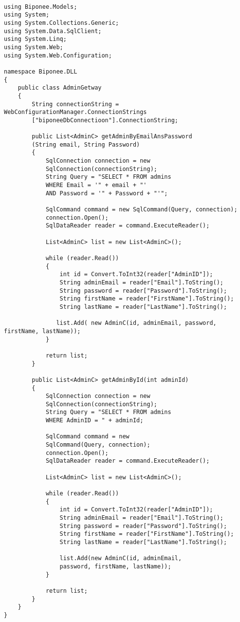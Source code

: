 \begin{lstlisting}

using Biponee.Models;
using System;
using System.Collections.Generic;
using System.Data.SqlClient;
using System.Linq;
using System.Web;
using System.Web.Configuration;

namespace Biponee.DLL
{
    public class AdminGetway
    {
        String connectionString = WebConfigurationManager.ConnectionStrings
        ["biponeeDbConnectioon"].ConnectionString;

        public List<AdminC> getAdminByEmailAnsPassword
        (String email, String Password)
        {
            SqlConnection connection = new 
            SqlConnection(connectionString);
            String Query = "SELECT * FROM admins
            WHERE Email = '" + email + "'
            AND Password = '" + Password + "'";

            SqlCommand command = new SqlCommand(Query, connection);
            connection.Open();
            SqlDataReader reader = command.ExecuteReader();

            List<AdminC> list = new List<AdminC>();

            while (reader.Read())
            {
                int id = Convert.ToInt32(reader["AdminID"]);
                String adminEmail = reader["Email"].ToString();
                String password = reader["Password"].ToString();
                String firstName = reader["FirstName"].ToString();
                String lastName = reader["LastName"].ToString();

               list.Add( new AdminC(id, adminEmail, password, firstName, lastName));
            }

            return list;
        }

        public List<AdminC> getAdminById(int adminId)
        {
            SqlConnection connection = new 
            SqlConnection(connectionString);
            String Query = "SELECT * FROM admins 
            WHERE AdminID = " + adminId;

            SqlCommand command = new 
            SqlCommand(Query, connection);
            connection.Open();
            SqlDataReader reader = command.ExecuteReader();

            List<AdminC> list = new List<AdminC>();

            while (reader.Read())
            {
                int id = Convert.ToInt32(reader["AdminID"]);
                String adminEmail = reader["Email"].ToString();
                String password = reader["Password"].ToString();
                String firstName = reader["FirstName"].ToString();
                String lastName = reader["LastName"].ToString();

                list.Add(new AdminC(id, adminEmail, 
                password, firstName, lastName));
            }

            return list;
        }
    }
}
\end{lstlisting}

